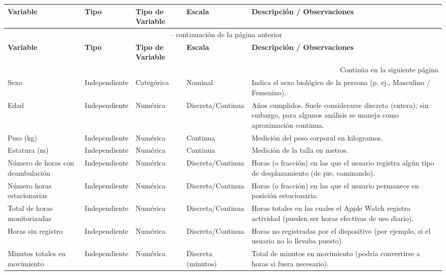 \begin{table}[H]
\centering
\caption{Variables Recolectadas en el Instrumento}
\label{tab:variables_instrumento}
\scriptsize
\begin{longtable}{@{}p{3.5cm}p{2cm}p{2cm}p{2cm}p{4.5cm}@{}}
\toprule
\textbf{Variable} & \textbf{Tipo} & \textbf{Tipo de Variable} & \textbf{Escala} & \textbf{Descripción / Observaciones} \\
\midrule
\endfirsthead
\multicolumn{5}{c}{\tablename\ \thetable{} -- continuación de la página anterior} \\
\toprule
\textbf{Variable} & \textbf{Tipo} & \textbf{Tipo de Variable} & \textbf{Escala} & \textbf{Descripción / Observaciones} \\
\midrule
\endhead
\midrule
\multicolumn{5}{r}{Continúa en la siguiente página} \\
\endfoot
\bottomrule
\endlastfoot
Sexo & Independiente & Categórica & Nominal & Indica el sexo biológico de la persona (p. ej., Masculino / Femenino). \\
\midrule
Edad & Independiente & Numérica & Discreta/Continua & Años cumplidos. Suele considerarse discreta (entera); sin embargo, para algunos análisis se maneja como aproximación continua. \\
\midrule
Peso (kg) & Independiente & Numérica & Continua & Medición del peso corporal en kilogramos. \\
\midrule
Estatura (m) & Independiente & Numérica & Continua & Medición de la talla en metros. \\
\midrule
Número de horas con deambulación & Independiente & Numérica & Discreta/Continua & Horas (o fracción) en las que el usuario registra algún tipo de desplazamiento (de pie, caminando). \\
\midrule
Número horas estacionarias & Independiente & Numérica & Discreta/Continua & Horas (o fracción) en las que el usuario permanece en posición estacionaria. \\
\midrule
Total de horas monitorizadas & Independiente & Numérica & Discreta/Continua & Horas totales en las cuales el Apple Watch registra actividad (pueden ser horas efectivas de uso diario). \\
\midrule
Horas sin registro & Independiente & Numérica & Discreta/Continua & Horas no registradas por el dispositivo (por ejemplo, si el usuario no lo llevaba puesto). \\
\midrule
Minutos totales en movimiento & Independiente & Numérica & Discreta (minutos) & Total de minutos en movimiento (podría convertirse a horas si fuera necesario). \\

\end{longtable}
\end{table}
